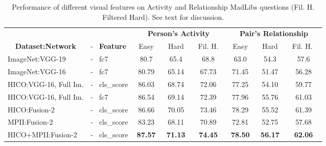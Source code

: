 \documentclass[runningheads]{llncs}
\begin{document}
\begin{table}[h!]
	\begin{center}
		\begin{tabular}{ll|ccc|ccc}
\hline
			\multicolumn{2}{c|}{} & \multicolumn{3}{|c|}{\bf Person's Activity} & \multicolumn{3}{c}{\bf Pair's Relationship}\\ \multicolumn{1}{c}{\bf Dataset:Network} \ &- \ {\bf Feature} & {\ Easy\ } & {\ Hard\ } & {\ Fil. H.\ } & {\ Easy\ } & {\ Hard\ } & {\ Fil. H. \ }\\ \hline
\multicolumn{1}{l}{ImageNet:VGG-19~\cite{yu2015visual}} \ &- \ fc7  & 80.7 & 65.4 & 68.8 & 63.0 & 54.3 & 57.6 \\ 
			\multicolumn{1}{l}{ImageNet:VGG-16} \ &- \ fc7  			& 80.79 & 65.14 & 67.73 & 71.45 & 51.47 & 56.28 \\ \hline
			\multicolumn{1}{l}{HICO:VGG-16, Full Im.}\ 	 &- \ cls\_score 		& 86.03 & 68.74 & 72.06 & 77.25 & 54.10 & 59.77 \\ \multicolumn{1}{l}{HICO:VGG-16, Full Im.}\ 	 &- \ fc7 				& 86.54 & 69.14 & 72.39 & 77.96 & 55.76 & 61.03\\ \hline
			\multicolumn{1}{l}{HICO:Fusion-2}\   &- \ cls\_score 	& 86.66 & 70.05 & 73.46 & 78.29 & 55.52 & 61.39 \\ \multicolumn{1}{l}{MPII:Fusion-2}\   &- \ cls\_score 	& 83.23	& 68.11	& 70.89 & 72.81 & 52.75 & 57.68 \\ \hline
			\multicolumn{1}{l}{HICO+MPII:Fusion-2}\   &- \ cls\_score 	& {\bf 87.57} & {\bf 71.13} & {\bf 74.45} & {\bf 78.50} & {\bf 56.17} & {\bf 62.06}

\end{tabular}
	\end{center}
	\caption{Performance of different visual features on Activity and Relationship MadLibs questions (Fil. H.  Filtered Hard). See text for discussion.}
\label{table:madlibs}
\end{table}
\end{document}
